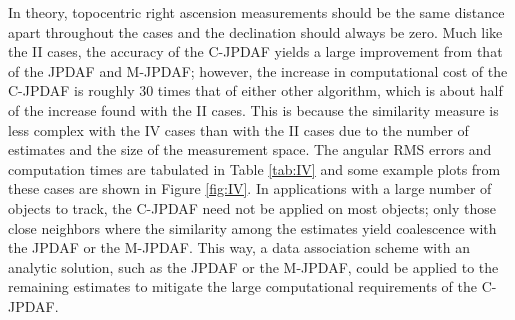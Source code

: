 In theory, topocentric right ascension measurements should be the same distance apart throughout the cases and the declination should always be zero.
Much like the II cases, the accuracy of the C-JPDAF yields a large improvement from that of the JPDAF and M-JPDAF; however, the increase in computational cost of the C-JPDAF is roughly $30$ times that of either other algorithm, which is about half of the increase found with the II cases.
This is because the similarity measure is less complex with the IV cases than with the II cases due to the number of estimates and the size of the measurement space.
The angular RMS errors and computation times are tabulated in Table \ref{tab:IV} and some example plots from these cases are shown in Figure \ref{fig:IV}. In applications with a large number of objects to track, the C-JPDAF need not be applied on most objects; only those close neighbors where the similarity among the estimates yield coalescence with the JPDAF or the M-JPDAF. This way, a data association scheme with an analytic solution, such as the JPDAF or the M-JPDAF, could be applied to the remaining estimates to mitigate the large computational requirements of the C-JPDAF.





